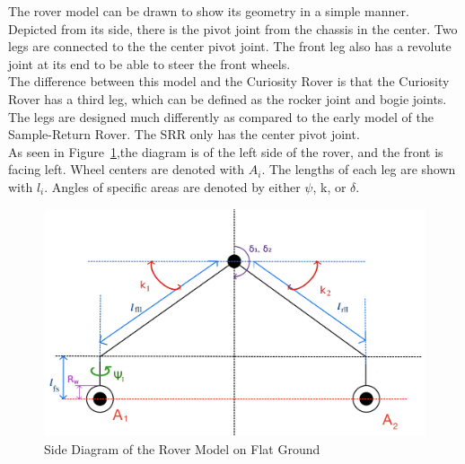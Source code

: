 The rover model can be drawn to show its geometry in a simple manner. Depicted from its side, there is the pivot joint from the chassis in the center. Two legs are connected to the the center pivot joint. The front leg also has a revolute joint at its end to be able to steer the front wheels. \\

The difference between this model and the Curiosity Rover is that the Curiosity Rover has a third leg, which can be defined as the rocker joint and bogie joints. The legs are designed much differently as compared to the early model of the Sample-Return Rover. The SRR only has the center pivot joint. \\

As seen in Figure~\ref{traction_control:discussion:side-diagram},the diagram is of the left side of the rover, and the front is facing left. Wheel centers are denoted with $A_{i}$. The lengths of each leg are shown with $l_{i}$. Angles of specific areas are denoted by either $\psi$, k, or $\delta$. 

\begin{figure}[H]
	\centering
	\includegraphics[scale=0.3]{sections/discussion/images/side-diagram.png}	
	\caption{Side Diagram of the Rover Model on Flat Ground}	
	\label{traction_control:discussion:side-diagram}
\end{figure}


